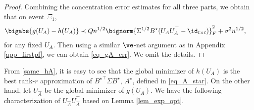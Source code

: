\documentclass[aos,preprint]{imsart}
\begin{document}
\begin{proof}
	

	

	

		

	Combining the concentration error estimates for all three parts, we obtain that on event $\Xi_1$,
	\begin{align*}
	\bigabs{g(U_A) - h(U_A)} &\prec  Q n^{1/2} \bignorm{\Sigma^{1/2} B^{\star} (U_AU_A^{\top} - \id_{t\times t})}_F^2  +  \sigma^2 n^{ 1/2} ,
		\end{align*}
	for any fixed $U_A$. Then using a similar $\ve$-net argument as in Appendix \ref{app_firstpf}, we can obtain  \eqref{eq_gA_err}. We omit the details.
	\end{proof}
	
	
	
	
	From \eqref{same_hA}, it is easy to see that the global minimizer of $h(U_A)$ is the best rank-$r$ approximation of ${B^{\star}}^{\top}\Sigma B^{\star}$, $A^\star$, defined in \eqref{eq_A_star}. On the other hand, let $U_{\hat A}$ be the global minimizer of $g(U_A)$. We have the following characterization of $U_{\hat A}U_{\hat A}^\top$ based on Lemma \ref{lem_exp_opt}.
	
\end{document}
